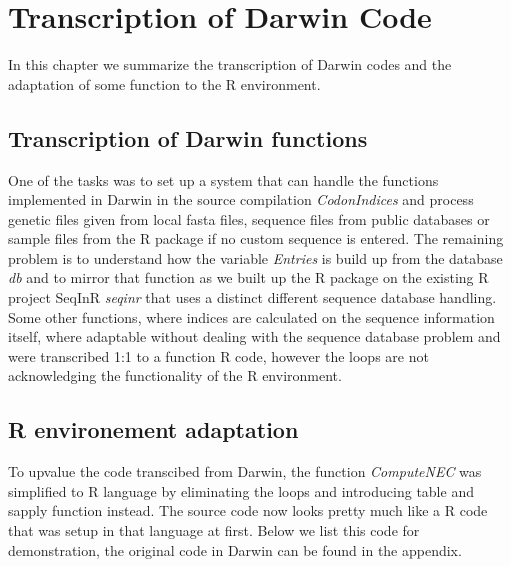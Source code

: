 \chapter{Transcription of Darwin Code}
In this chapter we summarize the transcription of Darwin codes and the adaptation of some function to the R environment.


\section{Transcription of Darwin functions}
One of the tasks was to set up a system that can handle the functions implemented in Darwin in the source compilation \textit{CodonIndices} and process genetic files given from local fasta files, sequence files from public databases or sample files from the R package if no custom sequence is entered. The remaining problem is to understand how the variable \textit{Entries} is build up from the database \textit{db} and to mirror that function as we built up the R package on the existing R project SeqInR \textit{seqinr} that uses a distinct different sequence database handling.
Some other functions, where indices are calculated on the sequence information itself, where adaptable without dealing with the sequence database problem and were transcribed 1:1 to a function R code, however the loops are not acknowledging the functionality of the R environment.

\section{R environement adaptation}
To upvalue the code transcibed from Darwin, the function \textit{ComputeNEC} was simplified to R language by eliminating the loops and introducing table and sapply function instead. The source code now looks pretty much like a R code that was setup in that language at first. Below we list this code for demonstration, the original code in Darwin can be found in the appendix.

  